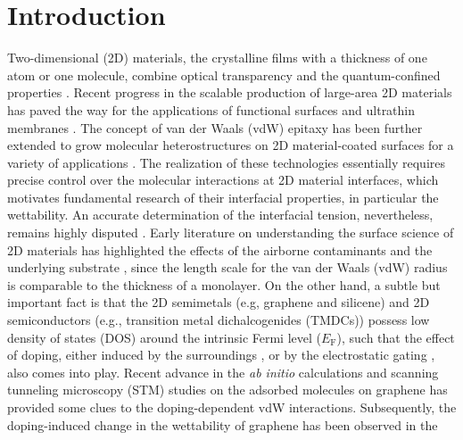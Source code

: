\documentclass[journal=langd5,manuscript=article,email=true,hyperref=true,keywords=true]{achemso}
\begin{document}
\newpage{}

\section{Introduction}
\label{sec:org6e779b8}

Two-dimensional (2D) materials, the crystalline films with a thickness
of one atom or one molecule, combine optical transparency and the
quantum-confined properties
\cite{Novoselov_2005,Mas_Ballest__2011,Novoselov_2016}.  Recent progress
in the scalable production of large-area 2D materials
\cite{Boott_2015,Li_2016} has paved the way for the applications of
functional surfaces and ultrathin membranes
\cite{Prasai_2012,Feng_2016,Rafiee_2010,Yin_2014,Surwade_2015,Hern_ndez_2013}.
The concept of van der Waals (vdW) epitaxy has been further extended
to grow molecular heterostructures on 2D material-coated surfaces for
a variety of applications
\cite{Shi_2012_epitaxy_graphene,Kim_2017_remote_epitaxy,Novoselov_2016}. The
realization of these technologies essentially requires precise control
over the molecular interactions at 2D material interfaces, which
motivates fundamental research of their interfacial properties, in
particular the wettability.  An accurate determination of the
interfacial tension, nevertheless, remains highly disputed
\cite{taherian2013what,Kozbial_2015,Parobek_2015,Govind_Rajan_2016}. Early
literature on understanding the surface science of 2D materials has
highlighted the effects of the airborne contaminants
\cite{li_effect_2013,Xu_2013_withwhat,kozbial_study_2014,Kozbial_2015,Chow_2015}
and the underlying substrate
\cite{raj_wettability_2013,rafiee_wetting_2012,shih_breakdown_2012,shih_wetting_2013},
since the length scale for the van der Waals (vdW) radius is
comparable to the thickness of a monolayer. On the other hand, a
subtle but important fact is that the 2D semimetals (e.g, graphene and
silicene) and 2D semiconductors (e.g., transition metal
dichalcogenides (TMDCs)) possess low density of states (DOS) around
the intrinsic Fermi level (\(E_{\mathrm{F}}\)), such that the effect of
doping, either induced by the surroundings
\cite{Chen_2013,Varchon_2007,Giovannetti_2008}, or by the electrostatic
gating \cite{Das_2008,Perera_2013}, also comes into play. Recent advance
in the \textit{ab initio} calculations and scanning tunneling
microscopy (STM) studies on the adsorbed molecules on graphene
\cite{Muruganathan_2015,Huttmann_2015} has provided some clues to the
doping-dependent vdW interactions. Subsequently, the doping-induced
change in the wettability of graphene has been observed in the
\end{document}
